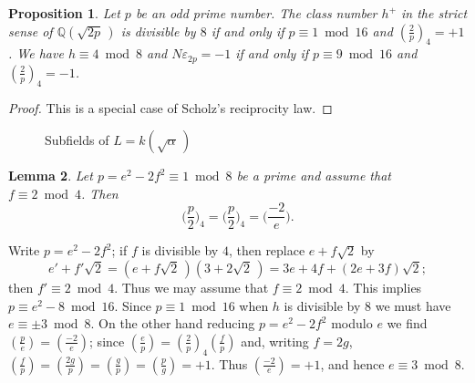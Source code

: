 \documentclass{amsart}
\newtheorem{lem}{Lemma}
\newtheorem{prop}[lem]{Proposition}
\newcommand{\Q}{{\mathbb Q}}
\newcommand{\gen}{{\operatorname{gen}}}
\newcommand{\eps}{\varepsilon}
\begin{document}
\begin{prop}\label{Pr01}
  Let $p$ be an odd prime number. The class number $h^+$ in the strict
  sense of $\Q(\sqrt{2p}\,)$ is divisible by $8$ if and only if
  $p \equiv 1 \bmod 16$ and $(\frac 2p)_4 = +1$.
  We have $h \equiv 4 \bmod 8$ and $N\eps_{2p} = -1$  if and only if
  $p \equiv 9 \bmod 16$ and $(\frac 2p)_4 = -1$.
\end{prop}
  

\begin{proof}
  This is a special case of Scholz's reciprocity law.  
\end{proof}



\begin{figure}[ht!]
  \caption{Subfields of $L = k(\sqrt{\alpha}\,)$}
\end{figure}


\begin{lem}\label{Lem1}
  Let $p = e^2 - 2f^2 \equiv 1 \bmod 8$ be a prime and assume that
  $f \equiv 2 \bmod 4$.  Then
  $$ \Big(\frac p2 \Big)_4 = \Big(\frac p2 \Big)_4 = \Big(\frac{-2}e \Big). $$
\end{lem}


Write $p = e^2 - 2f^2$; if $f$ is divisible by $4$, then
replace $e + f \sqrt{2}$ by
$$ e' + f'\sqrt{2} = (e + f \sqrt{2}\,)(3 + 2\sqrt{2}\,)
   = 3e+4f + (2e+3f) \sqrt{2}; $$
then $f' \equiv 2 \bmod 4$. Thus we may assume that $f \equiv 2 \bmod 4$.
This implies $p \equiv e^2 - 8 \bmod 16$. Since $p \equiv 1 \bmod 16$ when
$h$ is divisible by $8$ we must have $e \equiv \pm 3 \bmod 8$.
On the other hand reducing $p = e^2 - 2f^2$ modulo $e$ we find
$(\frac pe) = (\frac{-2}e)$; since $(\frac ep) = (\frac{2}p)_4 (\frac fp)$
and, writing $f = 2g$,
$(\frac fp) = (\frac{2g}p) = (\frac{g}p) = (\frac pg) = +1$.
Thus $(\frac{-2}e) = +1$, and hence $e \equiv 3 \bmod 8$.
\end{document}
